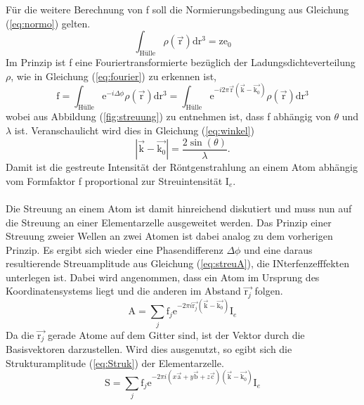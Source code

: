 Für die weitere Berechnung von f soll die Normierungsbedingung aus Gleichung (\ref{eq:normo}) gelten.
\begin{equation}
 \int_{\text{Hülle}} \rho (\vec{\text{r}}) \text{d}\text{r}^3 = \text{z}\text{e}_0
\label{eq:normo}
\end{equation}
Im Prinzip ist f eine Fouriertransformierte bezüglich der Ladungsdichteverteilung $\rho$, wie in Gleichung (\ref{eq:fourier}) zu erkennen ist,
\begin{equation}
\text{f} = \int_{\text{Hülle}} \text{e}^{-i\Delta\phi}\rho(\vec{\text{r}}) \text{d}\text{r}^3 = \int_{\text{Hülle}} \text{e}^{-i2\pi \vec{\text{r}}(\vec{\text{k}}-\vec{\text{k}_0})}\rho(\vec{\text{r}}) \text{d}\text{r}^3
\label{eq:fourier}
\end{equation}
wobei aus Abbildung (\ref{fig:streuung}) zu entnehmen ist, dass f abhängig von $\theta$ und $\lambda$ ist.
Veranschaulicht wird dies in Gleichung (\ref{eq:winkel})
\begin{equation}
|\vec{\text{k}}-\vec{\text{k}_0}| = \frac{2 \sin(\theta)}{\lambda}.
\label{eq:winkel}
\end{equation}
Damit ist die gestreute Intensität der Röntgenstrahlung an einem Atom abhängig vom Formfaktor f proportional zur Streuintensität I$_e$.\\\\
Die Streuung an einem Atom ist damit hinreichend diskutiert und muss nun auf die Streuung an einer Elementarzelle ausgeweitet werden.
Das Prinzip  einer Streuung zweier Wellen an zwei Atomen ist dabei analog zu dem vorherigen Prinzip.
Es ergibt sich wieder eine Phasendifferenz $\Delta \phi$ und eine daraus resultierende Streuamplitude aus Gleichung (\ref{eq:streuA}), die INterfenzefffekten unterlegen ist.
Dabei wird angenommen, dass ein Atom im Ursprung des Koordinatensystems liegt und die anderen im Abstand $\vec{\text{r}_j}$ folgen.
\begin{equation}
\text{A} = \sum_j \text{f}_j \text{e}^{-2\pi i \vec{\text{r}_j} (\vec{\text{k}}-\vec{\text{k}_0}) } \text{I}_e
\label{eq:streuA}
\end{equation}
Da die $\vec{\text{r}_j}$ gerade Atome auf dem Gitter sind, ist der Vektor durch die Basisvektoren darzustellen.
Wird dies ausgenutzt, so egibt sich die Strukturamplitude (\ref{eq:Struk}) der Elementarzelle.
\begin{equation}
\text{S} = \sum_j \text{f}_j \text{e}^{-2\pi i (x\vec{\text{a}}+y \vec{\text{b}}+ z \vec{\text{c}}) (\vec{\text{k}}-\vec{\text{k}_0}) } \text{I}_e
\label{eq:Struk}
\end{equation}
